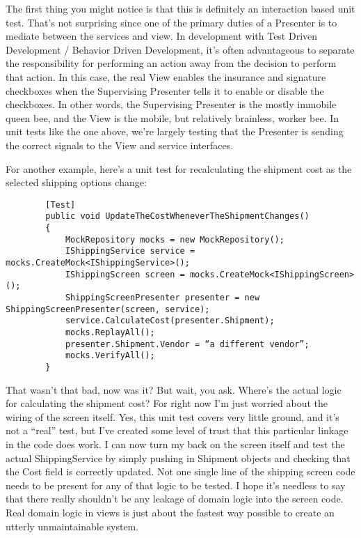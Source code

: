 \documentclass{article}
\begin{document}
{The first thing you might notice is that this is definitely an interaction based unit test.  That's not surprising since one of the primary duties of a Presenter is to mediate between the services and view.  In development with Test Driven Development / Behavior Driven Development, it's often advantageous to separate the responsibility for performing an action away from the decision to perform that action.  In this case, the real View enables the insurance and signature checkboxes when the Supervising Presenter tells it to enable or disable the checkboxes.  In other words, the Supervising Presenter is the mostly immobile queen bee, and the View is the mobile, but relatively brainless, worker bee.  In unit tests like the one above, we're largely testing that the Presenter is sending the correct signals to the View and service interfaces.

For another example, here's a unit test for recalculating the shipment cost as the selected shipping options change:

 \begin{lstlisting}
        [Test]
        public void UpdateTheCostWheneverTheShipmentChanges()
        {
            MockRepository mocks = new MockRepository();
            IShippingService service = mocks.CreateMock<IShippingService>();
            IShippingScreen screen = mocks.CreateMock<IShippingScreen>();
            ShippingScreenPresenter presenter = new ShippingScreenPresenter(screen, service);
            service.CalculateCost(presenter.Shipment);
            mocks.ReplayAll();
            presenter.Shipment.Vendor = “a different vendor”;
            mocks.VerifyAll();
		}
\end{lstlisting}		

That wasn't that bad, now was it?  But wait, you ask.  Where's the actual logic for calculating the shipment cost?  For right now I'm just worried about the wiring of the screen itself.  Yes, this unit test covers very little ground, and it's not a “real” test, but I've created some level of trust that this particular linkage in the code does work.  I can now turn my back on the screen itself and test the actual ShippingService by simply pushing in Shipment objects and checking that the Cost field is correctly updated.  Not one single line of the shipping screen code needs to be present for any of that logic to be tested.  I hope it's needless to say that there really shouldn't be any leakage of domain logic into the screen code.  Real domain logic in views is just about the fastest way possible to create an utterly unmaintainable system.

}
\end{document}
